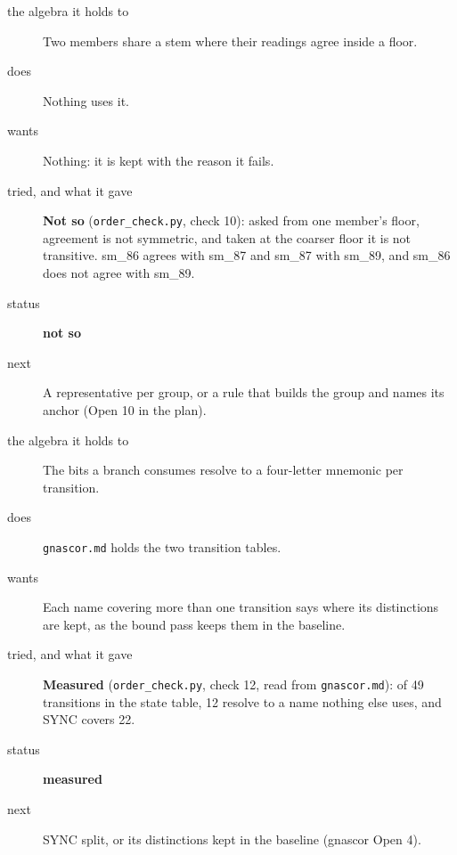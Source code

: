 \begin{description}
\item[{the algebra it holds to}] Two members share a stem where their readings agree inside a floor.
\item[{does}] Nothing uses it.
\item[{wants}] Nothing: it is kept with the reason it fails.
\item[{tried, and what it gave}] \textbf{Not so} (\texttt{order\_\allowbreak{}check.\allowbreak{}py}, check 10): asked from one member's floor, agreement is not symmetric, and taken at the coarser floor it is not transitive. sm\_\allowbreak{}86 agrees with sm\_\allowbreak{}87 and sm\_\allowbreak{}87 with sm\_\allowbreak{}89, and sm\_\allowbreak{}86 does not agree with sm\_\allowbreak{}89.
\item[{status}] \textbf{not so}
\item[{next}] A representative per group, or a rule that builds the group and names its anchor (Open 10 in the plan).
\end{description}

\begin{description}
\item[{the algebra it holds to}] The bits a branch consumes resolve to a four-letter mnemonic per transition.
\item[{does}] \texttt{gnascor.\allowbreak{}md} holds the two transition tables.
\item[{wants}] Each name covering more than one transition says where its distinctions are kept, as the bound pass keeps them in the baseline.
\item[{tried, and what it gave}] \textbf{Measured} (\texttt{order\_\allowbreak{}check.\allowbreak{}py}, check 12, read from \texttt{gnascor.\allowbreak{}md}): of 49 transitions in the state table, 12 resolve to a name nothing else uses, and SYNC covers 22.
\item[{status}] \textbf{measured}
\item[{next}] SYNC split, or its distinctions kept in the baseline (gnascor Open 4).
\end{description}

